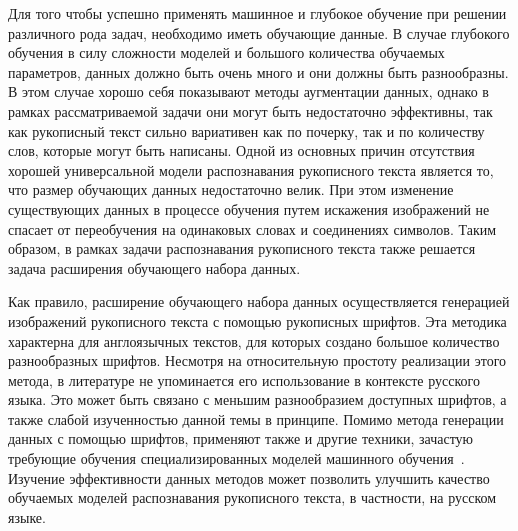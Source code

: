 Для того чтобы успешно применять машинное и глубокое обучение при решении различного рода задач, необходимо иметь обучающие данные.
В случае глубокого обучения в силу сложности моделей и большого количества обучаемых параметров, данных должно быть очень много и они должны быть разнообразны.
В этом случае хорошо себя показывают методы аугментации данных, однако в рамках рассматриваемой задачи они могут быть недостаточно эффективны,
так как рукописный текст сильно вариативен как по почерку, так и по количеству слов, которые могут быть написаны.
Одной из основных причин отсутствия хорошей универсальной модели распознавания рукописного текста является то, что размер обучающих данных недостаточно велик.
При этом изменение существующих данных в процессе обучения путем искажения изображений не спасает от переобучения на одинаковых словах и соединениях символов.
Таким образом, в рамках задачи распознавания рукописного текста также решается задача расширения обучающего набора данных.

Как правило, расширение обучающего набора данных осуществляется генерацией изображений рукописного текста с помощью рукописных шрифтов.
Эта методика характерна для англоязычных текстов, для которых создано большое количество разнообразных шрифтов.
Несмотря на относительную простоту реализации этого метода, в литературе не упоминается его использование в контексте русского языка.
Это может быть связано с меньшим разнообразием доступных шрифтов, а также слабой изученностью данной темы в принципе.
Помимо метода генерации данных с помощью шрифтов, применяют также и другие техники,
зачастую требующие обучения специализированных моделей машинного обучения~\cite{shonenkov2021stackmix,fogel2020scrabblegan}.
Изучение эффективности данных методов может позволить улучшить качество обучаемых моделей распознавания рукописного текста,
в частности, на русском языке.
